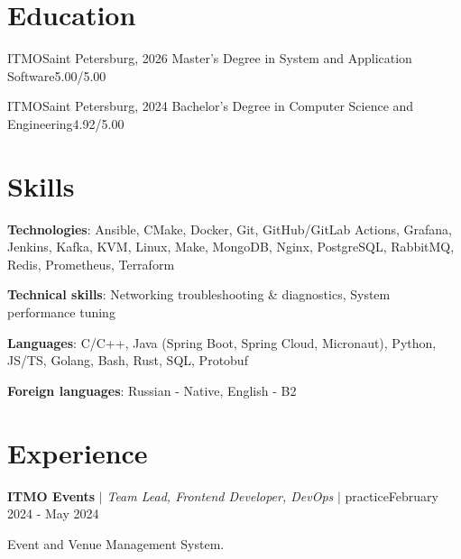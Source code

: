 \documentclass[letterpaper,11pt]{article}
\begin{document}
\section{Education}
\resumeSubHeadingListStart
  \resumeSubheading
    {ITMO}{Saint Petersburg, 2026}
    {Master’s Degree in System and Application Software}{5.00/5.00}

  \resumeSubheading
    {ITMO}{Saint Petersburg, 2024}
    {Bachelor’s Degree in Computer Science and Engineering}{4.92/5.00}
\resumeSubHeadingListEnd

\section{Skills}
\resumeSubHeadingListStart
  \small{\item{
    \textbf{Technologies}{: Ansible, CMake, Docker, Git, GitHub/GitLab Actions, Grafana, Jenkins, Kafka, KVM, Linux, Make, MongoDB, Nginx, PostgreSQL, RabbitMQ, Redis, Prometheus, Terraform }

    \textbf{Technical skills}{: Networking troubleshooting \& diagnostics, System performance tuning}

   \textbf{Languages}{: C/C++, Java (Spring Boot, Spring Cloud, Micronaut), Python, JS/TS, Golang, Bash, Rust, SQL, Protobuf }

   \textbf{Foreign languages}{: Russian - Native, English - B2}%
  }}
\resumeSubHeadingListEnd

\section{Experience}
\resumeSubHeadingListStart
  \resumeExperienceHeading
    {\textbf{ITMO Events} $|$ \footnotesize\emph{Team Lead, Frontend Developer, DevOps} $|$ practice}{February 2024 - May 2024}

    {\vspace{-10pt}\small Event and Venue Management System.\vspace{-7pt}}

  \resumeItemListStart
  \resumeItemListEnd
\end{document}
